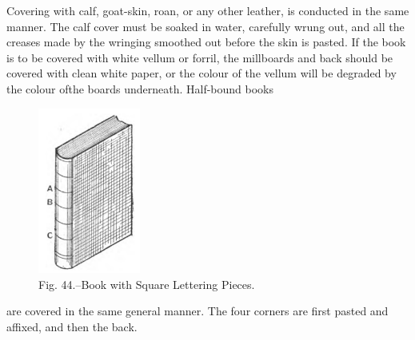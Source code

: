 \documentclass[twoside]{book}
\begin{document}
Covering with calf, goat-skin, roan, or any other
leather, is conducted in the same manner. The calf
cover must be soaked in water, carefully wrung out,
and all the creases made by the wringing smoothed
out before the skin is pasted. If the book is to be
covered with white vellum or forril, the millboards
and back should be covered with clean white paper,
or the colour of the vellum will be degraded by the
colour ofthe boards underneath. Half-bound books
	\begin{figure}[h]
		\centering
		\includegraphics[width=0.3\textwidth]{Figures/_044.png}
		\caption*{Fig. 44.--Book with Square Lettering Pieces.}
	\end{figure}
are covered in the same general manner. The four
corners are first pasted and affixed, and then the back.
\end{document}
